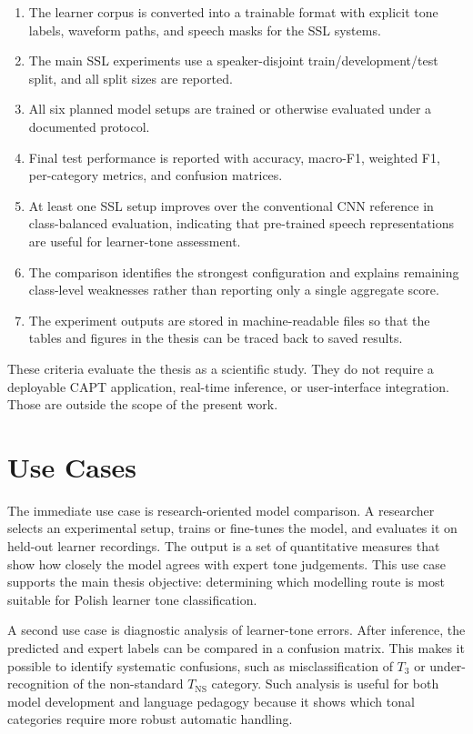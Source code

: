 \begin{enumerate}[label=\textbf{AC\arabic*.}, leftmargin=1.5cm]
  \item The learner corpus is converted into a trainable format with explicit
  tone labels, waveform paths, and speech masks for the SSL systems.
  \item The main SSL experiments use a speaker-disjoint train/development/test
  split, and all split sizes are reported.
  \item All six planned model setups are trained or otherwise evaluated under a
  documented protocol.
  \item Final test performance is reported with accuracy, macro-F1, weighted F1,
  per-category metrics, and confusion matrices.
  \item At least one SSL setup improves over the conventional CNN reference in
  class-balanced evaluation, indicating that pre-trained speech representations
  are useful for learner-tone assessment.
  \item The comparison identifies the strongest configuration and explains
  remaining class-level weaknesses rather than reporting only a single aggregate
  score.
  \item The experiment outputs are stored in machine-readable files so that the
  tables and figures in the thesis can be traced back to saved results.
\end{enumerate}

These criteria evaluate the thesis as a scientific study. They do not require a
deployable CAPT application, real-time inference, or user-interface integration.
Those are outside the scope of the present work.

\section{Use Cases}
\label{sec:proposal:usecases}

The immediate use case is research-oriented model comparison. A researcher
selects an experimental setup, trains or fine-tunes the model, and evaluates it
on held-out learner recordings. The output is a set of quantitative measures
that show how closely the model agrees with expert tone judgements. This use
case supports the main thesis objective: determining which modelling route is
most suitable for Polish learner tone classification.

A second use case is diagnostic analysis of learner-tone errors. After
inference, the predicted and expert labels can be compared in a confusion
matrix. This makes it possible to identify systematic confusions, such as
misclassification of \(T_3\) or under-recognition of the non-standard
\(T_{\mathrm{NS}}\) category. Such analysis is useful for both model development
and language pedagogy because it shows which tonal categories require more
robust automatic handling.

